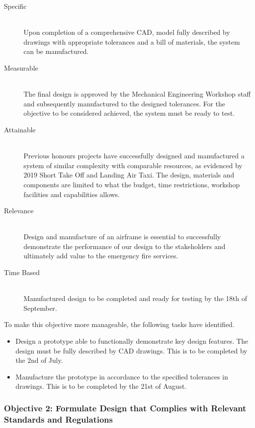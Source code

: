 \begin{appendices}
\begin{description}
    \item[Specific] \hfill \\
    Upon completion of a comprehensive CAD, model fully described by drawings with appropriate tolerances and a bill of materials, the system can be manufactured.
    \item[Measurable] \hfill  \\
    The final design is approved by the Mechanical Engineering Workshop staff and subsequently manufactured to the designed tolerances. For the objective to be considered achieved, the system must be ready to test.
    \item[Attainable] \hfill \\
    Previous honours projects have successfully designed and manufactured a system of similar complexity with comparable resources, as evidenced by 2019 Short Take Off and Landing Air Taxi. The design, materials and components are limited to what the budget, time restrictions, workshop facilities and capabilities allows.
    \item[Relevance] \hfill  \\
    Design and manufacture of an airframe is essential to successfully demonstrate the performance of our design to the stakeholders and ultimately add value to the emergency fire services.
    \item[Time Based] \hfill \\
    Manufactured design to be completed and ready for testing by the 18th of September.
\end{description}

To make this objective more manageable, the following tasks have identified.
\begin{itemize}
    \item Design a prototype able to functionally demonstrate key design features. The design must be fully described by CAD drawings. This is to be completed by the 2nd of July.
    \item Manufacture the prototype in accordance to the specified tolerances in drawings. This is to be completed by the 21st of August.
\end{itemize}


\subsubsection{Objective 2: Formulate Design that Complies with Relevant Standards and Regulations}


\end{appendices}
